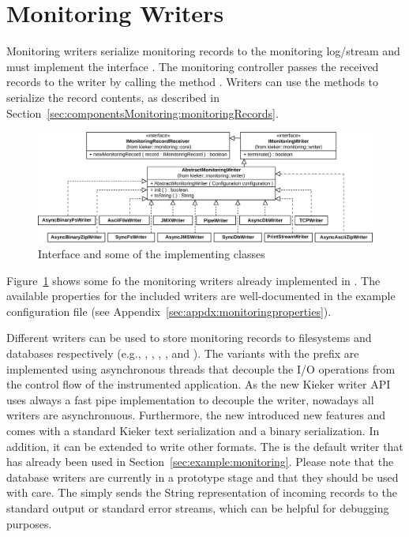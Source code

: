 \section{Monitoring Writers}\label{sec:monitoring-log-writers}

Monitoring writers serialize monitoring records to the monitoring log/stream and  %
must implement the interface . The monitoring %
controller passes the received records to the writer by calling the method %
. Writers can use the methods to serialize the %
record contents, as described in Section~\ref{sec:componentsMonitoring:monitoringRecords}.

\begin{figure}[b]%
	\begin{centering}
		\includegraphics[scale=0.7]{images/kieker_writerimplsuserguide-modified}
		\caption{Interface  and some of the implementing classes}
		\label{figure:monitoringLogWritersHierarchy}
	\end{centering}
\end{figure}

Figure~\ref{figure:monitoringLogWritersHierarchy} shows some fo the monitoring writers %
already implemented in \KiekerMonitoringPart{}. The available properties for the %
included writers are well-documented in the %
example configuration file (see Appendix~\ref{sec:appdx:monitoringproperties}). %


Different writers can be used %
to store monitoring records to filesystems and databases respectively (e.g., , , %
, , and ). %
The variants with the prefix  are implemented using asynchronous %
threads that decouple the I/O operations from the control flow of the %
instrumented application. %
As the new Kieker writer API uses always a fast pipe implementation to decouple the writer, nowadays all writers are asynchronuous.
Furthermore, the new  introduced new features and comes with a standard Kieker text serialization and a binary serialization.
In addition, it can be extended to write other formats.
The  is the default writer that has already been used in %
Section~\ref{sec:example:monitoring}. %
Please note that the database writers are currently in a prototype stage and
that they should be used with care. %
The  simply sends the String representation of incoming %
records to the standard output or standard error streams, which can be helpful %
for debugging purposes.

